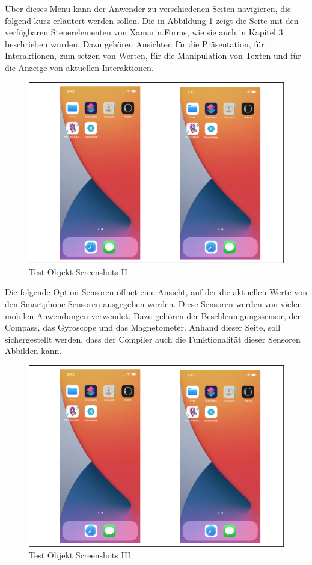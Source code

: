 Über dieses Menu kann der Anwender zu verschiedenen Seiten navigieren, die folgend kurz erläutert werden sollen.  Die in Abbildung \ref{fig:TestObjectII} zeigt die Seite mit den verfügbaren Steuerelementen von Xamarin.Forms,  wie sie auch in Kapitel 3 beschrieben wurden. Dazu gehören Ansichten für die Präsentation, für Interaktionen, zum setzen von Werten, für die Manipulation von Texten und für die Anzeige von aktuellen Interaktionen.
\begin{figure}[!ht]
 \includegraphics[width=\textwidth,keepaspectratio]{Images/Screenshot/AppIconAndMenu.png}
 \caption{Test Objekt Screenshots II}
 \label{fig:TestObjectII}
\end{figure}

Die folgende Option Sensoren öffnet eine Ansicht, auf der die aktuellen Werte von den Smartphone-Sensoren ausgegeben werden.  Diese Sensoren werden von vielen mobilen Anwendungen verwendet. Dazu gehören der Beschleunigungssensor, der Compass,  das Gyroscope und das Magnetometer.  Anhand dieser Seite,  soll sichergestellt werden, dass der Compiler auch die Funktionalität dieser Sensoren Abbilden kann. 

\begin{figure}[!ht]
 \includegraphics[width=\textwidth,keepaspectratio]{Images/Screenshot/AppIconAndMenu.png}
 \caption{Test Objekt Screenshots III}
 \label{fig:TestObjectIII}
\end{figure}


